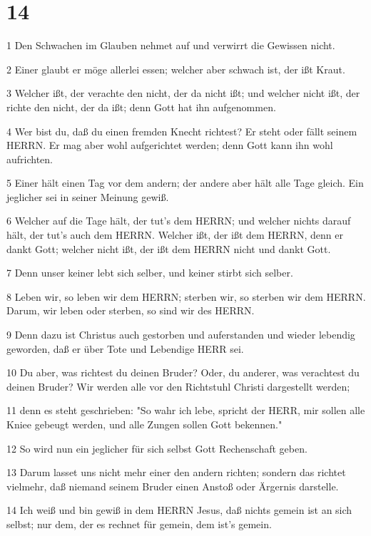 \chapter{14}

\par 1 Den Schwachen im Glauben nehmet auf und verwirrt die Gewissen nicht.
\par 2 Einer glaubt er möge allerlei essen; welcher aber schwach ist, der ißt Kraut.
\par 3 Welcher ißt, der verachte den nicht, der da nicht ißt; und welcher nicht ißt, der richte den nicht, der da ißt; denn Gott hat ihn aufgenommen.
\par 4 Wer bist du, daß du einen fremden Knecht richtest? Er steht oder fällt seinem HERRN. Er mag aber wohl aufgerichtet werden; denn Gott kann ihn wohl aufrichten.
\par 5 Einer hält einen Tag vor dem andern; der andere aber hält alle Tage gleich. Ein jeglicher sei in seiner Meinung gewiß.
\par 6 Welcher auf die Tage hält, der tut's dem HERRN; und welcher nichts darauf hält, der tut's auch dem HERRN. Welcher ißt, der ißt dem HERRN, denn er dankt Gott; welcher nicht ißt, der ißt dem HERRN nicht und dankt Gott.
\par 7 Denn unser keiner lebt sich selber, und keiner stirbt sich selber.
\par 8 Leben wir, so leben wir dem HERRN; sterben wir, so sterben wir dem HERRN. Darum, wir leben oder sterben, so sind wir des HERRN.
\par 9 Denn dazu ist Christus auch gestorben und auferstanden und wieder lebendig geworden, daß er über Tote und Lebendige HERR sei.
\par 10 Du aber, was richtest du deinen Bruder? Oder, du anderer, was verachtest du deinen Bruder? Wir werden alle vor den Richtstuhl Christi dargestellt werden;
\par 11 denn es steht geschrieben: "So wahr ich lebe, spricht der HERR, mir sollen alle Kniee gebeugt werden, und alle Zungen sollen Gott bekennen."
\par 12 So wird nun ein jeglicher für sich selbst Gott Rechenschaft geben.
\par 13 Darum lasset uns nicht mehr einer den andern richten; sondern das richtet vielmehr, daß niemand seinem Bruder einen Anstoß oder Ärgernis darstelle.
\par 14 Ich weiß und bin gewiß in dem HERRN Jesus, daß nichts gemein ist an sich selbst; nur dem, der es rechnet für gemein, dem ist's gemein.
